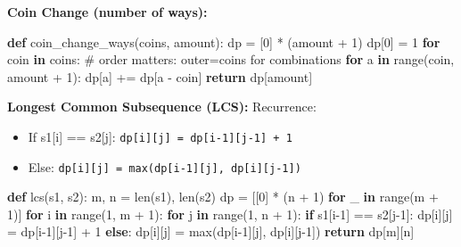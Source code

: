 \documentclass[11pt]{article}
\providecommand{\tightlist}{\setlength{\itemsep}{1pt}\setlength{\parskip}{0pt}}
\newenvironment{Shaded}{\begin{snugshade}}{\end{snugshade}}
\newcommand{\BuiltInTok}[1]{\textcolor[rgb]{0.50,0.55,0.55}{#1}}
\newcommand{\CommentTok}[1]{\textcolor[rgb]{0.48,0.49,0.49}{#1}}
\newcommand{\ControlFlowTok}[1]{\textcolor[rgb]{0.99,0.74,0.29}{\textbf{#1}}}
\newcommand{\DecValTok}[1]{\textcolor[rgb]{0.96,0.45,0.00}{#1}}
\newcommand{\KeywordTok}[1]{\textcolor[rgb]{0.81,0.81,0.76}{\textbf{#1}}}
\newcommand{\NormalTok}[1]{\textcolor[rgb]{0.81,0.81,0.76}{#1}}
\newcommand{\OperatorTok}[1]{\textcolor[rgb]{0.81,0.81,0.76}{#1}}
\begin{document}
\textbf{Coin Change (number of ways):}


\begin{Shaded}
\begin{Highlighting}[]
\KeywordTok{def}\NormalTok{ coin\_change\_ways(coins, amount):}
\NormalTok{    dp }\OperatorTok{=}\NormalTok{ [}\DecValTok{0}\NormalTok{] }\OperatorTok{*}\NormalTok{ (amount }\OperatorTok{+} \DecValTok{1}\NormalTok{)}
\NormalTok{    dp[}\DecValTok{0}\NormalTok{] }\OperatorTok{=} \DecValTok{1}
    \ControlFlowTok{for}\NormalTok{ coin }\KeywordTok{in}\NormalTok{ coins:          }\CommentTok{\# order matters: outer=coins for combinations}
        \ControlFlowTok{for}\NormalTok{ a }\KeywordTok{in} \BuiltInTok{range}\NormalTok{(coin, amount }\OperatorTok{+} \DecValTok{1}\NormalTok{):}
\NormalTok{            dp[a] }\OperatorTok{+=}\NormalTok{ dp[a }\OperatorTok{{-}}\NormalTok{ coin]}
    \ControlFlowTok{return}\NormalTok{ dp[amount]}
\end{Highlighting}
\end{Shaded}

\textbf{Longest Common Subsequence (LCS):}
Recurrence:

\begin{itemize}
\tightlist
\item
  If s1{[}i{]} == s2{[}j{]}: \texttt{dp{[}i{]}{[}j{]}\ =\ dp{[}i-1{]}{[}j-1{]}\ +\ 1}
\item
  Else: \texttt{dp{[}i{]}{[}j{]}\ =\ max(dp{[}i-1{]}{[}j{]},\ dp{[}i{]}{[}j-1{]})}
\end{itemize}


\begin{Shaded}
\begin{Highlighting}[]
\KeywordTok{def}\NormalTok{ lcs(s1, s2):}
\NormalTok{    m, n }\OperatorTok{=} \BuiltInTok{len}\NormalTok{(s1), }\BuiltInTok{len}\NormalTok{(s2)}
\NormalTok{    dp }\OperatorTok{=}\NormalTok{ [[}\DecValTok{0}\NormalTok{] }\OperatorTok{*}\NormalTok{ (n }\OperatorTok{+} \DecValTok{1}\NormalTok{) }\ControlFlowTok{for}\NormalTok{ \_ }\KeywordTok{in} \BuiltInTok{range}\NormalTok{(m }\OperatorTok{+} \DecValTok{1}\NormalTok{)]}
    \ControlFlowTok{for}\NormalTok{ i }\KeywordTok{in} \BuiltInTok{range}\NormalTok{(}\DecValTok{1}\NormalTok{, m }\OperatorTok{+} \DecValTok{1}\NormalTok{):}
        \ControlFlowTok{for}\NormalTok{ j }\KeywordTok{in} \BuiltInTok{range}\NormalTok{(}\DecValTok{1}\NormalTok{, n }\OperatorTok{+} \DecValTok{1}\NormalTok{):}
            \ControlFlowTok{if}\NormalTok{ s1[i}\OperatorTok{{-}}\DecValTok{1}\NormalTok{] }\OperatorTok{==}\NormalTok{ s2[j}\OperatorTok{{-}}\DecValTok{1}\NormalTok{]:}
\NormalTok{                dp[i][j] }\OperatorTok{=}\NormalTok{ dp[i}\OperatorTok{{-}}\DecValTok{1}\NormalTok{][j}\OperatorTok{{-}}\DecValTok{1}\NormalTok{] }\OperatorTok{+} \DecValTok{1}
            \ControlFlowTok{else}\NormalTok{:}
\NormalTok{                dp[i][j] }\OperatorTok{=} \BuiltInTok{max}\NormalTok{(dp[i}\OperatorTok{{-}}\DecValTok{1}\NormalTok{][j], dp[i][j}\OperatorTok{{-}}\DecValTok{1}\NormalTok{])}
    \ControlFlowTok{return}\NormalTok{ dp[m][n]}
\end{Highlighting}
\end{Shaded}
\end{document}
